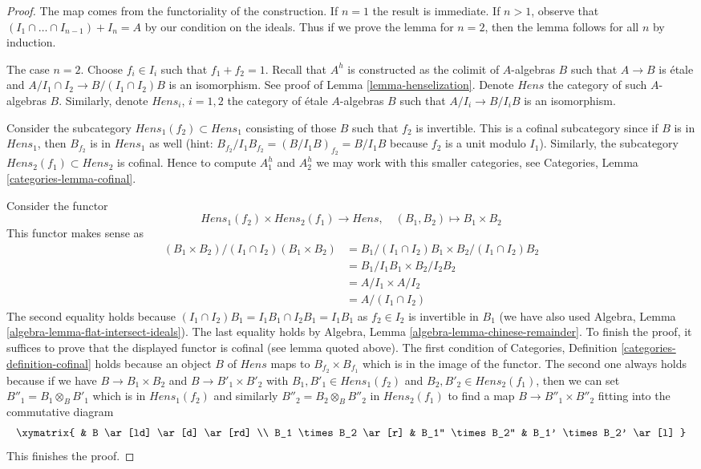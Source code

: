 \begin{proof}
The map comes from the functoriality of the construction.
If $n = 1$ the result is immediate. If $n > 1$, observe that
$(I_1 \cap \ldots \cap I_{n - 1}) + I_n = A$ by our condition
on the ideals. Thus if we prove the lemma for $n = 2$, then
the lemma follows for all $n$ by induction.

\medskip\noindent
The case $n = 2$. Choose $f_i \in I_i$ such that $f_1 + f_2 = 1$.
Recall that $A^h$ is constructed as the colimit of $A$-algebras $B$
such that $A \to B$ is \'etale and $A/I_1 \cap I_2 \to B/(I_1 \cap I_2)B$
is an isomorphism. See proof of Lemma \ref{lemma-henselization}.
Denote $Hens$ the category of such $A$-algebras $B$.
Similarly, denote $Hens_i$, $i = 1, 2$ the category of \'etale $A$-algebras
$B$ such that $A/I_i \to B/I_iB$ is an isomorphism.

\medskip\noindent
Consider the subcategory $Hens_1(f_2) \subset Hens_1$ consisting of
those $B$ such that $f_2$ is invertible. This is a cofinal subcategory
since if $B$ is in $Hens_1$, then $B_{f_2}$ is in $Hens_1$ as well
(hint: $B_{f_2}/I_1B_{f_2} = (B/I_1B)_{f_2} = B/I_1B$ because
$f_2$ is a unit modulo $I_1$). Similarly, the subcategory
$Hens_2(f_1) \subset Hens_2$ is cofinal. Hence to compute $A_1^h$ and
$A_2^h$ we may work with this smaller categories, see
Categories, Lemma \ref{categories-lemma-cofinal}.

\medskip\noindent
Consider the functor
$$
Hens_1(f_2) \times Hens_2(f_1) \to Hens,\quad (B_1, B_2) \mapsto B_1 \times B_2
$$
This functor makes sense as
\begin{align*}
(B_1 \times B_2)/(I_1 \cap I_2)(B_1 \times B_2)
& =
B_1/(I_1 \cap I_2)B_1 \times B_2/(I_1 \cap I_2)B_2 \\
& =
B_1/I_1B_1 \times B_2/I_2B_2 \\
& = A/I_1 \times A/I_2 \\
& = A/(I_1 \cap I_2)
\end{align*}
The second equality holds because
$(I_1 \cap I_2)B_1 = I_1B_1 \cap I_2B_1 = I_1B_1$ as $f_2 \in I_2$
is invertible in $B_1$
(we have also used Algebra, Lemma \ref{algebra-lemma-flat-intersect-ideals}).
The last equality holds by Algebra, Lemma \ref{algebra-lemma-chinese-remainder}.
To finish the proof, it suffices to prove that the displayed functor
is cofinal (see lemma quoted above).
The first condition of
Categories, Definition \ref{categories-definition-cofinal}
holds because an object $B$ of $Hens$ maps to $B_{f_2} \times B_{f_1}$
which is in the image of the functor. The second one always holds because
if we have $B \to B_1 \times B_2$ and $B \to B'_1 \times B'_2$ with
$B_1, B'_1 \in Hens_1(f_2)$ and $B_2, B'_2 \in Hens_2(f_1)$, then
we can set $B''_1 = B_1 \otimes_B B'_1$ which is in $Hens_1(f_2)$
and similarly $B''_2 = B_2 \otimes_B B''_2$ in $Hens_2(f_1)$
to find a map $B \to B''_1 \times B''_2$ fitting into the commutative diagram
$$
\xymatrix{
& B \ar[ld] \ar[d] \ar[rd] \\
B_1 \times B_2 \ar[r] & B_1'' \times B_2'' & B_1' \times B_2' \ar[l]
}
$$
This finishes the proof.
\end{proof}
